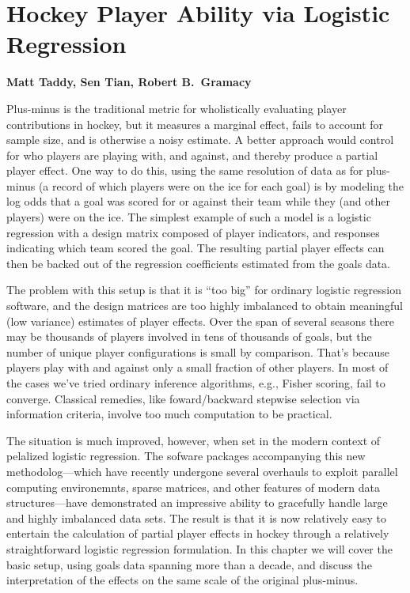 
\chapter{Hockey Player Ability via Logistic Regression}

\noindent
{\bf Matt Taddy, Sen Tian, Robert B.~Gramacy}

\bigskip
Plus-minus is the traditional metric for wholistically evaluating player
contributions in hockey, but it measures a marginal effect, fails to account
for sample size, and is otherwise a noisy estimate.  A better approach would
control for who players are playing with, and against, and thereby produce a
partial player effect.  One way to do this, using the same resolution of data
as for plus-minus (a record of which players were on the ice for each goal) is
by modeling the log odds that a goal was scored for or against their team
while they (and other players) were on the ice.  The simplest example of such
a model is a logistic regression with a design matrix composed of player
indicators, and responses indicating which team scored the goal.  The
resulting partial player effects can then be backed out of the regression
coefficients estimated from the goals data. 

The problem with this setup is that it is ``too big'' for ordinary logistic
regression software, and the design matrices are too highly imbalanced to
obtain meaningful (low variance) estimates of player effects.  Over the span
of several seasons there may be thousands of players involved in tens of
thousands of goals, but the number of unique player configurations is small by
comparison. That's because players play with and against only a small fraction
of other players.  In most of the cases we've tried ordinary inference
algorithms, e.g., Fisher scoring, fail to converge.  Classical remedies, like
foward/backward stepwise selection via information criteria, involve too much
computation to be practical.

The situation is much improved, however, when set in the modern context of
pelalized logistic regression.  The sofware packages accompanying this new
methodolog---which have recently undergone several overhauls to exploit
parallel computing environemnts, sparse matrices, and other features of modern
data structures---have demonstrated an impressive ability to gracefully handle
large and highly imbalanced data sets.  The result is that it is now relatively
easy to entertain the calculation of partial player effects in hockey through
a relatively straightforward logistic regression formulation.  In this chapter
we will cover the basic setup, using goals data spanning more than a decade,
and discuss the interpretation of the effects on the same scale of the
original plus-minus.  

